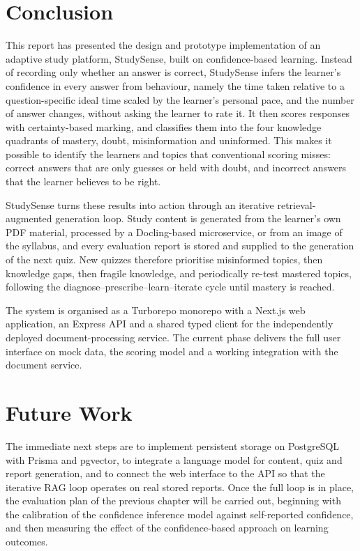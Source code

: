 \documentclass[12pt,a4paper,oneside]{report}
\begin{document}
\section{Conclusion}

This report has presented the design and prototype implementation of an
adaptive study platform, StudySense, built on confidence-based learning.
Instead of recording only whether an answer is correct, StudySense infers
the learner's confidence in every answer from behaviour, namely the time
taken relative to a question-specific ideal time scaled by the learner's
personal pace, and the number of answer changes, without asking the
learner to rate it. It then scores responses with certainty-based marking, and classifies them into the four knowledge
quadrants of mastery, doubt, misinformation and uninformed. This makes it
possible to identify the learners and topics that conventional scoring
misses: correct answers that are only guesses or held with doubt, and
incorrect answers that the learner believes to be right.

StudySense turns these results into action through an iterative
retrieval-augmented generation loop. Study content is generated from the
learner's own PDF material, processed by a Docling-based microservice, or
from an image of the syllabus, and every evaluation report is stored and
supplied to the generation of the next quiz. New quizzes therefore
prioritise misinformed topics, then knowledge gaps, then fragile
knowledge, and periodically re-test mastered topics, following the
diagnose--prescribe--learn--iterate cycle until mastery is reached.

The system is organised as a Turborepo monorepo with a Next.js web
application, an Express API and a shared typed client for the
independently deployed document-processing service. The current phase
delivers the full user interface on mock data, the scoring model and a
working integration with the document service.

\section{Future Work}

The immediate next steps are to implement persistent storage on
PostgreSQL with Prisma and pgvector, to integrate a language model for
content, quiz and report generation, and to connect the web interface to
the API so that the iterative RAG loop operates on real stored reports.
Once the full loop is in place, the evaluation plan of the previous
chapter will be carried out, beginning with the calibration of the
confidence inference model against self-reported confidence, and then
measuring the effect of the confidence-based approach on learning
outcomes.
\end{document}
